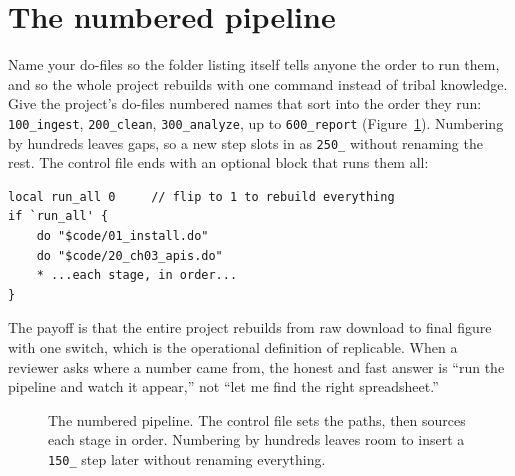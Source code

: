 \documentclass[
    a4paper,
    fontsize=10pt,
    twoside=true,
    numbers=noenddot,
]{kaobook}
\begin{document}
\section{The numbered pipeline}
Name your do-files so the folder listing itself tells anyone the order to run them, and so the whole project rebuilds with one command instead of tribal knowledge. Give the project's do-files numbered names that sort into the order they run: \texttt{100\_ingest}, \texttt{200\_clean}, \texttt{300\_analyze}, up to \texttt{600\_report} (Figure~\ref{fig:numbered}). Numbering by hundreds leaves gaps, so a new step slots in as \texttt{250\_} without renaming the rest. The control file ends with an optional block that runs them all:
{\footnotesize
\begin{verbatim}
local run_all 0     // flip to 1 to rebuild everything
if `run_all' {
    do "$code/01_install.do"
    do "$code/20_ch03_apis.do"
    * ...each stage, in order...
}
\end{verbatim}
}
The payoff is that the entire project rebuilds from raw download to final figure with one switch, which is the operational definition of replicable. When a reviewer asks where a number came from, the honest and fast answer is \enquote{run the pipeline and watch it appear,} not \enquote{let me find the right spreadsheet.}

\begin{figure}[htbp]
\centering
{}
\caption[The numbered pipeline]{The numbered pipeline. The control file sets the paths, then sources each stage in order. Numbering by hundreds leaves room to insert a \texttt{150\_} step later without renaming everything.}
\label{fig:numbered}
\end{figure}
\end{document}
